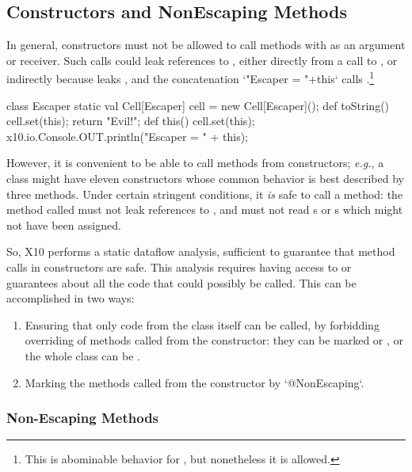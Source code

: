 \subsection{Constructors and NonEscaping Methods}

In general, constructors must not be allowed to call methods with as
an argument or receiver. Such calls could leak references to ,
either directly from a call to , or indirectly because
 leaks , and the concatenation 
\Xcd`"Escaper = "+this` calls .\footnote{This is abominable behavior for 
, but nonetheless it is allowed.}
\begin{xten}
class Escaper {
  static val Cell[Escaper] cell = new Cell[Escaper]();
  def toString() {
    cell.set(this);
    return "Evil!";
  }
  def this() {
    cell.set(this);
    x10.io.Console.OUT.println("Escaper = " + this);
  }
}
\end{xten}
%

However, it is convenient to be able to call methods from constructors; {\em
e.g.}, a class might have eleven constructors whose common behavior is best
described by three methods.  
Under certain stringent conditions, it {\em is}
safe to call a method: the method called must not leak references to
, and must not read s or s which might not have
been assigned.   

So, X10 performs a static dataflow analysis, sufficient to guarantee that
method calls in constructors are safe.  This analysis requires having access
to or guarantees about all the code that could possibly be called.  This can
be accomplished in two ways: 
\begin{enumerate}
\item Ensuring that only code from the class itself can be called, by 
      forbidding overriding of
      methods called from the constructor: they can be marked  or
      , or the whole class can be .
\item Marking the methods called from the constructor by
      \xcd`@NonEscaping`.
\end{enumerate}

\subsubsection{Non-Escaping Methods}



